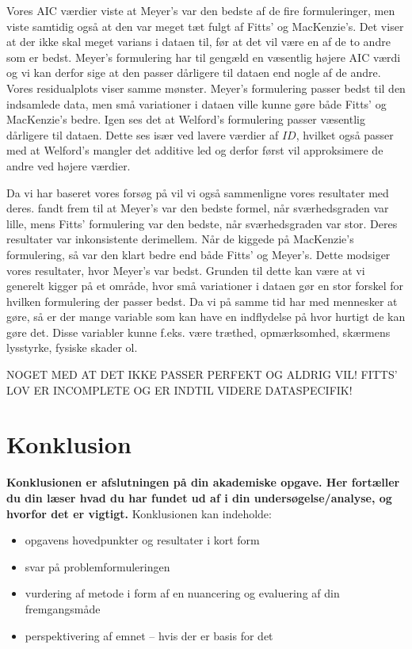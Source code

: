 Vores AIC værdier viste at Meyer's var den bedste af de fire formuleringer, men viste samtidig også at den var meget tæt fulgt af Fitts' og MacKenzie's. Det viser at der ikke skal meget varians i dataen til, før at det vil være en af de to andre som er bedst. Meyer's formulering har til gengæld en væsentlig højere AIC værdi og vi kan derfor sige at den passer dårligere til dataen end nogle af de andre. Vores residualplots viser samme mønster. Meyer's formulering passer bedst til den indsamlede data, men små variationer i dataen ville kunne gøre både Fitts' og MacKenzie's bedre. Igen ses det at Welford's formulering passer væsentlig dårligere til dataen. Dette ses især ved lavere værdier af $ID$, hvilket også passer med at Welford's mangler det additive led og derfor først vil approksimere de andre ved højere værdier.

Da vi har baseret vores forsøg på \cite{goldberg2015} vil vi også sammenligne vores resultater med deres. \cite{goldberg2015} fandt frem til at Meyer's var den bedste formel, når sværhedsgraden var lille, mens Fitts' formulering var den bedste, når sværhedsgraden var stor. Deres resultater var inkonsistente derimellem. Når de kiggede på MacKenzie's formulering, så var den klart bedre end både Fitts' og Meyer's. Dette modsiger vores resultater, hvor Meyer's var bedst. Grunden til dette kan være at vi generelt kigger på et område, hvor små variationer i dataen gør en stor forskel for hvilken formulering der passer bedst. Da vi på samme tid har med mennesker at gøre, så er der mange variable som kan have en indflydelse på hvor hurtigt de kan gøre det. Disse variabler kunne f.eks. være træthed, opmærksomhed, skærmens lysstyrke, fysiske skader ol.

NOGET MED AT DET IKKE PASSER PERFEKT OG ALDRIG VIL! FITTS' LOV ER INCOMPLETE OG ER INDTIL VIDERE DATASPECIFIK!

\chapter*{Konklusion}

\textbf{Konklusionen er afslutningen på din akademiske opgave. Her fortæller du din læser hvad du har fundet ud af i din undersøgelse/analyse, og hvorfor det er vigtigt.}
Konklusionen kan indeholde:
\begin{itemize}
	\item opgavens hovedpunkter og resultater i kort form
	\item svar på problemformuleringen
	\item vurdering af metode i form af en nuancering og evaluering af din fremgangsmåde
	\item perspektivering af emnet – hvis der er basis for det
\end{itemize}


\nocite{*}

\printbibliography

